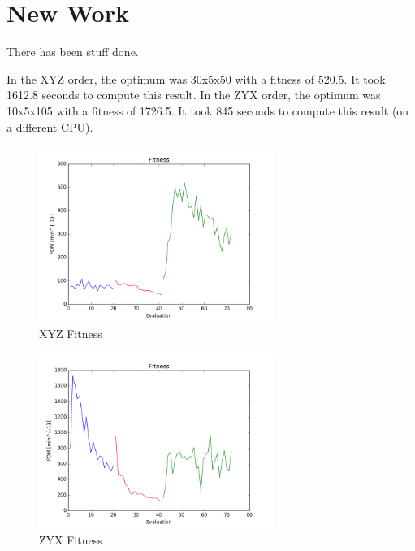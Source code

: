 \documentclass{article}
\begin{document}
\section{New Work}
There has been stuff done.

In the XYZ order, the optimum was 30x5x50 with a fitness of 520.5. It took 1612.8 seconds to compute this result.
In the ZYX order, the optimum was 10x5x105 with a fitness of 1726.5. It took 845 seconds to compute this result (on a different CPU).

\begin{figure}
    \centering
    \includegraphics[width=3.0in]{fitness_xyz}
    \caption{XYZ Fitness}
    \label{fig:fitness_xyz}
\end{figure}

\begin{figure}
    \centering
    \includegraphics[width=3.0in]{fitness_zyx}
    \caption{ZYX Fitness}
    \label{fig:fitness_zyx}
\end{figure}
\end{document}
